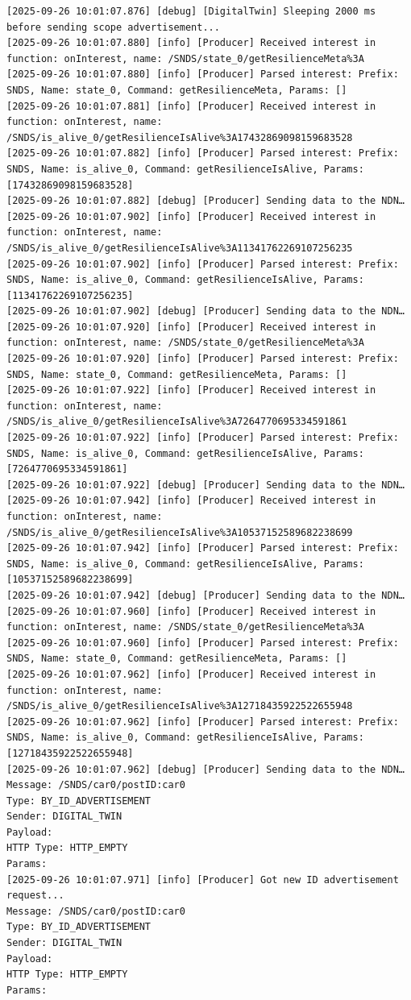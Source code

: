 \documentclass{article}
\begin{document}
\begin{lstlisting}[language=log,caption={Configured publish operations for each Node},label={lst:local-publish-inside-a}]
[2025-09-26 10:01:07.876] [debug] [DigitalTwin] Sleeping 2000 ms before sending scope advertisement...
[2025-09-26 10:01:07.880] [info] [Producer] Received interest in function: onInterest, name: /SNDS/state_0/getResilienceMeta%3A
[2025-09-26 10:01:07.880] [info] [Producer] Parsed interest: Prefix: SNDS, Name: state_0, Command: getResilienceMeta, Params: []
[2025-09-26 10:01:07.881] [info] [Producer] Received interest in function: onInterest, name: /SNDS/is_alive_0/getResilienceIsAlive%3A17432869098159683528
[2025-09-26 10:01:07.882] [info] [Producer] Parsed interest: Prefix: SNDS, Name: is_alive_0, Command: getResilienceIsAlive, Params: [17432869098159683528]
[2025-09-26 10:01:07.882] [debug] [Producer] Sending data to the NDN…
[2025-09-26 10:01:07.902] [info] [Producer] Received interest in function: onInterest, name: /SNDS/is_alive_0/getResilienceIsAlive%3A11341762269107256235
[2025-09-26 10:01:07.902] [info] [Producer] Parsed interest: Prefix: SNDS, Name: is_alive_0, Command: getResilienceIsAlive, Params: [11341762269107256235]
[2025-09-26 10:01:07.902] [debug] [Producer] Sending data to the NDN…
[2025-09-26 10:01:07.920] [info] [Producer] Received interest in function: onInterest, name: /SNDS/state_0/getResilienceMeta%3A
[2025-09-26 10:01:07.920] [info] [Producer] Parsed interest: Prefix: SNDS, Name: state_0, Command: getResilienceMeta, Params: []
[2025-09-26 10:01:07.922] [info] [Producer] Received interest in function: onInterest, name: /SNDS/is_alive_0/getResilienceIsAlive%3A7264770695334591861
[2025-09-26 10:01:07.922] [info] [Producer] Parsed interest: Prefix: SNDS, Name: is_alive_0, Command: getResilienceIsAlive, Params: [7264770695334591861]
[2025-09-26 10:01:07.922] [debug] [Producer] Sending data to the NDN…
[2025-09-26 10:01:07.942] [info] [Producer] Received interest in function: onInterest, name: /SNDS/is_alive_0/getResilienceIsAlive%3A10537152589682238699
[2025-09-26 10:01:07.942] [info] [Producer] Parsed interest: Prefix: SNDS, Name: is_alive_0, Command: getResilienceIsAlive, Params: [10537152589682238699]
[2025-09-26 10:01:07.942] [debug] [Producer] Sending data to the NDN…
[2025-09-26 10:01:07.960] [info] [Producer] Received interest in function: onInterest, name: /SNDS/state_0/getResilienceMeta%3A
[2025-09-26 10:01:07.960] [info] [Producer] Parsed interest: Prefix: SNDS, Name: state_0, Command: getResilienceMeta, Params: []
[2025-09-26 10:01:07.962] [info] [Producer] Received interest in function: onInterest, name: /SNDS/is_alive_0/getResilienceIsAlive%3A12718435922522655948
[2025-09-26 10:01:07.962] [info] [Producer] Parsed interest: Prefix: SNDS, Name: is_alive_0, Command: getResilienceIsAlive, Params: [12718435922522655948]
[2025-09-26 10:01:07.962] [debug] [Producer] Sending data to the NDN…
Message: /SNDS/car0/postID:car0
Type: BY_ID_ADVERTISEMENT
Sender: DIGITAL_TWIN
Payload: 
HTTP Type: HTTP_EMPTY
Params:
[2025-09-26 10:01:07.971] [info] [Producer] Got new ID advertisement request...
Message: /SNDS/car0/postID:car0
Type: BY_ID_ADVERTISEMENT
Sender: DIGITAL_TWIN
Payload: 
HTTP Type: HTTP_EMPTY
Params:


\end{lstlisting}
\end{document}
